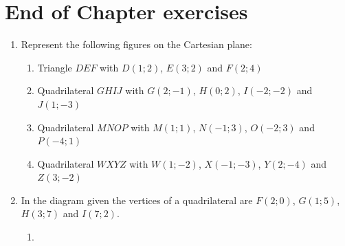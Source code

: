             \section{ End of Chapter exercises}
            \nopagebreak
        \label{m39167*id69671}\begin{enumerate}[noitemsep, label=\textbf{\arabic*}. ] 
            \label{m39167*uid43466}\item 
Represent the following figures on the Cartesian plane: \label{m39167*id6549695}\begin{enumerate}[noitemsep, label=\textbf{\alph*}. ] 
            \label{m39167*uid4746}\item Triangle $DEF$ with $D(1;2)$, $E(3;2)$ and $F(2;4)$ 
\label{m39167*uid4548}\item Quadrilateral $GHIJ$ with $G(2;-1)$, $H(0;2)$, $I(-2;-2)$ and $J(1;-3)$
\label{m39167*uid4549}\item Quadrilateral $MNOP$ with $M(1;1)$, $N(-1;3)$, $O(-2;3)$ and $P(-4;1)$ 
\label{m39167*uid5450}\item Quadrilateral $WXYZ$ with $W(1;-2)$, $X(-1;-3)$, $Y(2;-4)$ and $Z(3;-2)$
\end{enumerate}
                \label{m39167*uid46}\item 
In the diagram given the vertices of a quadrilateral are $F(2;0)$, $G(1;5)$, $H(3;7)$ and $I(7;2)$.
    \setcounter{subfigure}{0}
 	\begin{figure}[H] %
    \begin{center}
    \end{center}
 \end{figure}  
       \label{m39167*id69695}\begin{enumerate}[noitemsep, label=\textbf{\alph*}. ] 
            \label{m39167*uid47}\item 

\end{enumerate}
\end{enumerate}
